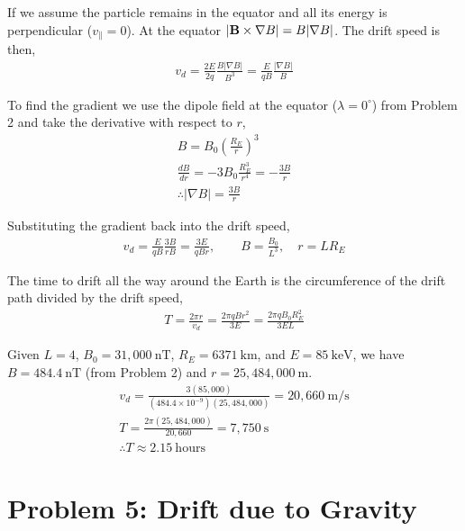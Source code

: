 \documentclass[11pt]{article}
\begin{document}
\hspace*{2em}If we assume the particle remains in the equator and all its energy is perpendicular ($v_{\parallel} = 0$). At the equator $|\bold{B}\times\nabla B| = B|\nabla B|$. The drift speed is then,
\begin{gather*}
v_d = \frac{2E}{2q}\frac{B|\nabla B|}{B^3} = \frac{E}{qB}\frac{|\nabla B|}{B}
\end{gather*}

\hspace*{2em}To find the gradient we use the dipole field at the equator ($\lambda = 0^\circ$) from Problem 2 and take the derivative with respect to $r$,
\begin{gather*}
B = B_0\left(\frac{R_E}{r}\right)^3 \\
\frac{dB}{dr} = -3B_0\frac{R_E^3}{r^4} = -\frac{3B}{r} \\
\therefore |\nabla B| = \frac{3B}{r}
\end{gather*}

\hspace*{2em}Substituting the gradient back into the drift speed,
\begin{gather*}
v_d = \frac{E}{qB}\frac{3B}{rB} = \frac{3E}{qBr}, \qquad B=\frac{B_0}{L^3}, \quad r = LR_E
\end{gather*}

\hspace*{2em}The time to drift all the way around the Earth is the circumference of the drift path divided by the drift speed,
\begin{gather*}
T = \frac{2\pi r}{v_d} = \frac{2\pi qBr^2}{3E} = \frac{2\pi q B_0 R_E^2}{3EL}
\end{gather*}

\hspace*{2em}Given $L=4$, $B_0 = 31,000~\mathrm{nT}$, $R_E = 6371~\mathrm{km}$, and $E = 85~\mathrm{keV}$, we have $B = 484.4~\mathrm{nT}$ (from Problem 2) and $r = 25,484,000~\mathrm{m}$.
\begin{gather*}
v_d = \frac{3(85,000)}{(484.4\times10^{-9})(25,484,000)} = 20,660~\mathrm{m/s} \\
T = \frac{2\pi(25,484,000)}{20,660} = 7,750~\mathrm{s} \\
\boxed{\therefore T \approx 2.15~\mathrm{hours}}
\end{gather*}

\newpage
\section*{Problem 5: Drift due to Gravity}
\end{document}
